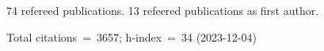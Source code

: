 74 refereed publications. 13 refeered publications as first author.

Total citations~=~3657; h-index~=~34 (2023-12-04)